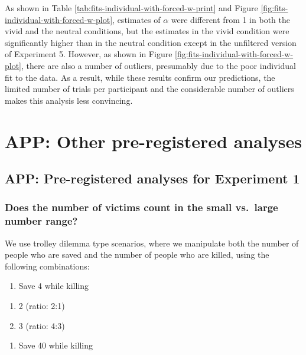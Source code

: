 \documentclass[
]{article}
\providecommand{\tightlist}{%
  \setlength{\itemsep}{0pt}\setlength{\parskip}{0pt}}
\begin{document}
As shown in Table \ref{tab:fits-individual-with-forced-w-print} and Figure \ref{fig:fits-individual-with-forced-w-plot}, estimates of \(\alpha\) were different from 1 in both the vivid and the neutral conditions, but the estimates in the vivid condition were significantly higher than in the neutral condition except in the unfiltered version of Experiment 5. However, as shown in Figure \ref{fig:fits-individual-with-forced-w-plot}, there are also a number of outliers, presumably due to the poor individual fit to the data. As a result, while these results confirm our predictions, the limited number of trials per participant and the considerable number of outliers makes this analysis less convincing.

\clearpage

\section{APP: Other pre-registered analyses}\label{app-other-pre-registered-analyses}

\subsection{APP: Pre-registered analyses for Experiment 1}\label{app:planned-analysis-exp1}

\subsubsection{Does the number of victims count in the small vs.~large number range?}\label{does-the-number-of-victims-count-in-the-small-vs.-large-number-range}

We use trolley dilemma type scenarios, where we manipulate both the number of people who are saved and the number of people who are killed, using the following combinations:

\begin{enumerate}
\def\labelenumi{\arabic{enumi}.}
\tightlist
\item
  Save 4 while killing
\end{enumerate}

\begin{enumerate}
\def\labelenumi{\alph{enumi}.}
\tightlist
\item
  2 (ratio: 2:1)
\item
  3 (ratio: 4:3)
\end{enumerate}

\begin{enumerate}
\def\labelenumi{\arabic{enumi}.}
\setcounter{enumi}{1}
\tightlist
\item
  Save 40 while killing
\end{enumerate}
\end{document}
